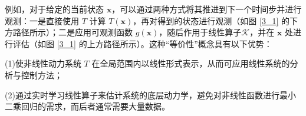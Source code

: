 \documentclass[lang=chs, degree=master, blindreview=false, winfonts=true]{yanputhesis}
\begin{document}
例如，对于给定的当前状态 $\bm{x}$，可以通过两种方式将其推进到下一个时间步并进行观测：一是直接使用 $T$ 计算 $T(\bm{x})$，再对得到的状态进行观测（如图 \ref{3_1} 的下方路径所示）；二是应用可观测函数 $g(\bm{x})$，随后作用于线性算子$\mathcal{K}$，并在 $\bm{x}$ 处进行评估（如图 \ref{3_1} 的上方路径所示）。这种“等价性”概念具有以下优势：

(1)使非线性动力系统 $T$ 在全局范围内以线性形式表示，从而可应用线性系统的分析与控制方法；

(2)通过实时学习线性算子来估计系统的底层动力学，避免对非线性函数进行最小二乘回归的需求，而后者通常需要大量数据。







\end{document}

